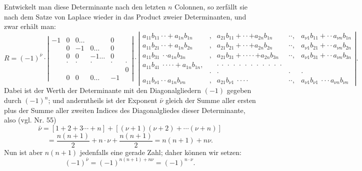 Entwickelt man diese Determinante nach den letzten $n$ Colonnen, so
zerf\"allt sie nach dem Satze von Laplace wieder in das Product zweier
Determinanten, und zwar erh\"alt man:
{\scriptsize\setlength{\arraycolsep}{3pt}
\[
R=(-1)^{\bar\nu}\cdot
\left|\begin{array}{cccccc}
-1 & 0 & 0\ldots & & 0\\
& 0 & -1 & 0\ldots & 0\\
& 0 & 0 & -1\ldots & 0\\
& \cdot & \cdot & \cdot & \cdot & \cdot\\
& & & & & 0\\
& 0 & 0 & 0\ldots & -1
\end{array}\right|
\cdot
\left|\begin{array}{ccccc}
a_{11}b_{11}\cdot\cdot+a_{1n}b_{1n} & , & a_{21}b_{11}+\cdot\cdot+a_{2n}b_{1n} & \cdot\cdot, & a_{\nu 1}b_{11}+\cdot\cdot a_{\nu n}b_{1n}\\
a_{11}b_{21}\cdot\cdot+a_{1n}b_{2n} & , & a_{21}b_{21}+\cdot\cdot+a_{2n}b_{2n} & \cdot\cdot, & a_{\nu 1}b_{21}+\cdot\cdot a_{\nu n}b_{2n}\\
a_{11}b_{31}\ \cdot\cdot a_{1n}b_{3n} & , & a_{21}b_{31}+\cdot\cdot\cdot\cdot+a_{2n}b_{3n} & \cdot\cdot, & a_{\nu 1}b_{31}+\cdot\cdot a_{\nu n}b_{3n}\\
a_{11}b_{41}\ \cdot\cdot\cdot\cdot+a_{1n}b_{1n}, & & \cdot\ \cdot\ \cdot\ \cdot\ \cdot\ \cdot\ \cdot\ \cdot\ \cdot\ \cdot\ \cdot\ \cdot & &\\
& \cdot & \cdot & \cdot & \cdot\\
a_{11}b_{\nu 1}\cdot\cdot\ a_{1n}b_{\nu n} & , & a_{21}b_{\nu 1}\ \cdot\cdot\cdot\cdot & \cdot\cdot, & a_{\nu 1}b_{\nu 1}\ \cdot\cdot\cdot a_{\nu n}b_{\nu n}
\end{array}\right|.
\]
}
Dabei ist der Werth der Determinante mit den Diagonalgliedern $(-1)$
gegeben durch $(-1)^n$; und anderntheils ist der Exponent $\bar\nu$ gleich der
Summe aller ersten plus der Summe aller zweiten Indices des Diagonalgliedes
dieser Determinante, also (vgl. Nr. 55)
\[
\bar\nu=[1+2+3\cdots+n]+[(\nu+1)(\nu+2)+\cdots(\nu+n)]
\]
\[
=\frac{n(n+1)}{2}+n\cdot\nu+\frac{n(n+1)}{2}=n(n+1)+n\nu.
\]
Nun ist aber $n(n+1)$ jedenfalls eine gerade Zahl; daher k\"onnen wir setzen:
\[
(-1)^{\bar\nu}=(-1)^{n(n+1)+n\nu}=(-1)^{n\cdot\nu}.
\]



